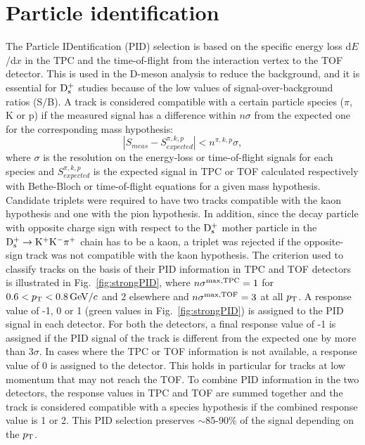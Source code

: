 \section{Particle identification}
\label{Sec:PID}
The Particle IDentification (PID) selection is based on the specific energy loss 
d$E$/d$x$ in the TPC and the time-of-flight from the interaction vertex to the 
TOF detector. This is used in the D-meson analysis to reduce the background, 
and it is essential for ${\rm D_s^+}$ studies because of the low values of signal-over-background
 ratios (S/B).
A track is  considered compatible with a certain particle species 
($\pi$, K or p) if the measured signal has a difference 
within $n\sigma$ from the expected one for the corresponding mass hypothesis:
\[
|S_{meas}-S^{\pi,k,p}_{expected}| < n^{\pi,k,p}\sigma ,
\]
where $\sigma$ is the resolution on the energy-loss or time-of-flight signals for each species
and $S^{\pi,k,p}_{expected}$ is the expected signal in TPC or TOF
calculated respectively with Bethe-Bloch or time-of-flight equations for a given mass hypothesis.
Candidate triplets were required to have two tracks compatible with 
the kaon hypothesis and one with the pion hypothesis. In addition, 
since the decay particle with opposite charge sign with respect to the ${\rm D_s^+}$
mother particle in the ${\rm D^{+}_\mathrm{s}\to K^+ K^-\pi^+}$ chain has to be a kaon, 
a triplet was rejected if the opposite-sign track was not compatible 
with the kaon hypothesis. 
The criterion used to classify tracks on the basis of their PID
information in TPC and TOF detectors is 
illustrated in Fig.~\ref{fig:strongPID}, where $n\sigma^{\rm max,TPC} = 1$ for
$0.6 < p_{\rm T} < 0.8 \, \mathrm{GeV}/c$ and 2 elsewhere and $n\sigma^{\rm max,TOF} = 3$ at all $p_{\rm T}$.  
A response value of -1, 0 or 1 (green values in Fig.~\ref{fig:strongPID}) 
is assigned to the PID signal in each
detector. For both the detectors, a final response value of -1 is assigned   
if the PID signal of the track is different from the expected one
by more than 3$\sigma$. In cases where the TPC or TOF information is not
available, a response value of 0 is assigned
to the detector. This holds in particular for tracks at low momentum that may not reach the TOF.  
To combine PID information in the two detectors,
the response values in TPC and TOF 
are summed together and the track is considered
compatible with a species hypothesis if the combined response value is 1 or 2. This
PID selection preserves $\sim$85-90\% of the signal depending on the $p_{\rm T}$.

